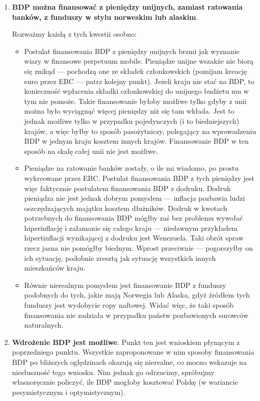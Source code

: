 \documentclass[11pt]{article}
\begin{document}
\begin{enumerate}
		\item \textbf{BDP można finansować z pieniędzy unijnych, zamiast ratowania banków, z funduszy w stylu norweskim lub alaskim}.
		\par Rozważmy każdą z tych kwestii osobno:
		\begin{itemize}
			\item Postulat finansowania BDP z pieniędzy unijnych brzmi jak wyznanie wiary w finansowe perpetuum mobile. Pieniądze unijne wszakże nie biorą się znikąd — pochodzą one ze składek członkowskich (pomijam kreację euro przez EBC — patrz kolejny punkt). Jeżeli kraju nie stać na BDP, to konieczność wpłacenia składki członkowskiej do unijnego budżetu mu w tym nie pomoże. Takie finansowanie byłoby możliwe tylko gdyby z unii można było wyciągnąć więcej pieniędzy niż się tam wkłada. Jest to jednak możliwe tylko w przypadku pojedynczych (i to biedniejszych) krajów, a więc byłby to sposób pasożytniczy, polegający na wprowadzeniu BDP w jednym kraju kosztem innych krajów. Finansowanie BDP w ten sposób na skalę całej unii nie jest możliwe.
			\item Pieniądze na ratowanie banków zostały, o ile mi wiadomo, po prostu wykreowane przez EBC. Postulat finansowania BDP z tych pieniędzy jest więc faktycznie postulatem finansowania BDP z dodruku. Dodruk pieniądza nie jest jednak dobrym pomysłem — inflacja pozbawia ludzi oszczędzających majątku kosztem dłużników. Dodruk w kwotach potrzebnych do finansowania BDP mógłby zaś bez problemu wywołać hiperinflację i załamanie się całego kraju — niedawnym przykładem hipertinflacji wynikającej z dodruku jest Wenezuela. Taki obrót spraw rzecz jasna nie pomógłby biednym. Wprost przeciwnie — pogorszyłby on ich sytuację, podobnie zresztą jak sytuację wszystkich innych mieszkańców kraju.
			\item Równie nierealnym pomysłem jest finansowanie BDP z funduszy podobnych do tych, jakie mają Norwegia lub Alaska, gdyż źródłem tych funduszy jest wydobycie ropy naftowej. Widać więc, że taki sposób finansowania nie zadziała w przypadku państw pozbawionych surowców naturalnych.
		\end{itemize}
		\item \textbf{Wdrożenie BDP jest możliwe}. Punkt ten jest wnioskiem płynącym z poprzedniego punktu. Wszystkie zaproponowane w nim sposoby finansowania BDP po bliższych oględzinach okazują się nierealne, co mocno wskazuje na niesłuszność tego wniosku. Nim jednak go odrzucimy, spróbujmy własnoręcznie policzyć, ile BDP mogłoby kosztować Polskę (w wariancie pesymistycznym i optymistycznym).

\end{enumerate}
\end{document}
